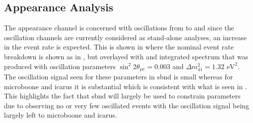 \clearpage
\subsection{\texorpdfstring{\nue Appearance Analysis}{nue Appearance Analysis}}\label{sec:nue_app}

The \nue appearance channel is concerned with oscillations from \numu to \nue and since the oscillation channels are currently considered as stand-alone analyses, an increase in the event rate is expected. This is shown in  where the nominal event rate breakdown is shown as in , but overlayed with and integrated spectrum that was produced with oscillation parameters $\sin^2{2\theta_{\mu e}} = 0.003$ and $\Delta m^2_{41} = 1.32 \text{ eV}^2$. The oscillation signal seen for these parameters in \gls{sbnd} is small whereas for \gls{microboone} and \gls{icarus} it is substantial which is consistent with what is seen in . This highlights the fact that \gls{sbnd} will largely be used to constrain parameters due to observing no or very few oscillated events with the oscillation signal being largely left to \gls{microboone} and \gls{icarus}. 


